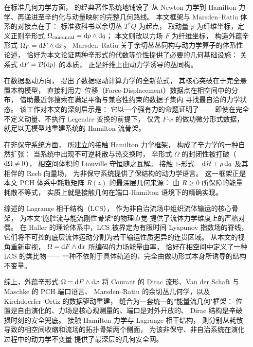 ﻿\documentclass[10pt,a4paper]{article}
\numberwithin{equation}{section}
\begin{document}
在标准几何力学方面，\textcite{MarsdenRatiu1994} 的经典著作系统地铺设了
从 Newton 力学到 Hamilton 力学、再递进至辛约化与动量映射的完整几何路线。
本文框架与 Marsden--Ratiu 体系的对接点在于：
标准教科书以余切丛 $T^*Q$ 为起点，
取动量 $p$ 为纤维坐标，定义正则辛形式
$\Omega_{\text{canonical}} = \text dp \wedge \text dq$；
本文则改以力场 $F$ 为纤维坐标，
构造外蕴辛形式 $\Omega_F = \text dF \wedge \text dx$。
Marsden--Ratiu 关于余切丛丛同构与动力学算子的体系性论述，
恰好为本文论证两种辛形式的代数等价性提供了必要的几何基础设施：
关系式 $\text dF = \mathcal D(\text dp)$ 的本质，
正是纤维上由动力学诱导的丛同构。

在数据驱动方向，\textcite{KirchdoerferOrtiz2016} 提出了数据驱动计算力学的全新范式，
其核心突破在于完全悬置本构模型，
直接利用力--位移（Force-Displacement）数据点在相空间中的分布，
借助最近邻搜索在满足平衡与兼容性约束的数据子集内
寻找最自洽的力学状态。
该工作对本文的深刻启示是：
它以一个强有力的命题证明了——
即使在完全不定义动量、不执行 Legendre 变换的前提下，
仅凭 $F\text{-}x$ 的做功微分形式数据，
就足以无模型地重建系统的 Hamilton 流骨架。

在非保守系统方面，\textcite{BravettiCruzTapias2017} 所建立的接触 Hamilton 力学框架，
构成了辛力学的一种自然扩张：
当系统中出现不可逆耗散与热交换时，
辛形式 $\Omega$ 的封闭性被打破（$\text d\Omega \neq 0$），
相空间体积的 Liouville 守恒随之瓦解。
接触 $1$-形式 $-\text d\mathcal H + p\,\text dq$ 及其相伴的 Reeb 向量场，
为非保守系统提供了保结构的动力学语言。
这一框架正是本文 PCH 体系中耗散矩阵 $R(z)$ 的最深层几何来源：
由 $R \ge 0$ 所保障的能量耗散不等式，
实质上就是接触几何在端口-Hamilton 语境下的精确实现。

\textcite{Haller2015} 综述的 Lagrange 相干结构（LCS），
作为非自治流场中组织流体输运的核心骨架，
为本文"胞腔流与能流刚性骨架"的物理直觉
提供了流体力学维度上的严格对偶。
在 Haller 的理论体系中，LCS 被界定为有限时间 Lyapunov 指数场的脊线，
它们将不可控的底层流体运动分割为若干输运性质迥异的连贯区域。
从本文的视角重新审视，
$\Omega = \text dF \wedge \text dx$ 所编码的力场能量曲率，
恰好在相空间中定义了一种 LCS 的类比物——
一种不依附于具体轨道的、完全由做功形式本身所诱导的结构不变量。

综上，外蕴辛形式 $\Omega = \text dF \wedge \text dx$ 将
Courant 的 Dirac 流形、Van der Schaft 与 Maschke 的 PCH 端口语言、
Marsden--Ratiu 的余切丛几何学，以及 Kirchdoerfer--Ortiz 的数据驱动重建，
缝合为一套统一的"能量流几何"框架：
位置是自由演化的、力场是核心观测量的、端口是对外开放的、
Dirac 结构是辛破损时刻的安全兜底。
接触 Hamilton 力学与 Lagrange 相干结构，
则分别从耗散导致的相空间收缩和流场的拓扑骨架两个侧面，
为该非保守、非自治系统在演化过程中的动力学不变量
提供了最深层的几何安全网。
\end{document}
